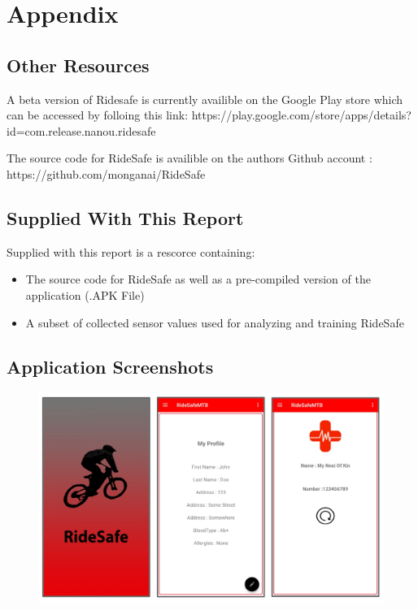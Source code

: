 \chapter{Appendix}

\section{Other Resources}

A beta version of Ridesafe is currently availible on the Google Play store which can be accessed by folloing this link: https://play.google.com/store/apps/details?id=com.release.nanou.ridesafe

The source code for RideSafe is availible on the authors Github account : https://github.com/monganai/RideSafe


\section{Supplied With This Report}

Supplied with this report is a rescorce containing:

\begin{itemize}
\item The source code for RideSafe as well as a pre-compiled version of the application (.APK File)

\item A subset of collected sensor values used for analyzing and training RideSafe

\end {itemize}

\newpage

\section{Application Screenshots}


\begin{figure}[h]
      \centering
      \includegraphics[scale = .9]{appendix/1.png}
      \caption{}
      \label{1}
\end{figure}




